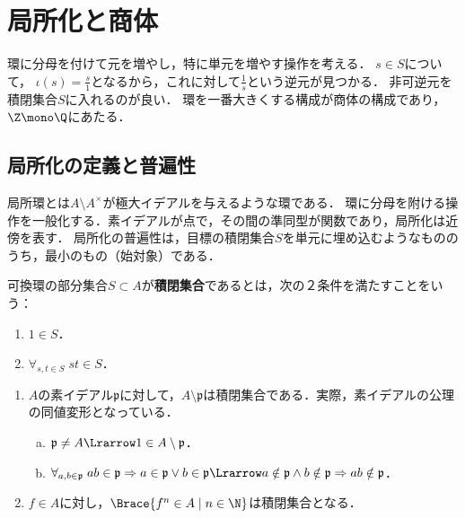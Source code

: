 \documentclass[uplatex,dvipdfmx]{jsreport}
\renewcommand{\p}{\mathfrak{p}}
\begin{document}
\section{局所化と商体}

\begin{tcolorbox}[colframe=ForestGreen, colback=ForestGreen!10!white,breakable,colbacktitle=ForestGreen!40!white,coltitle=black,fonttitle=\bfseries\sffamily,
title=]
    環に分母を付けて元を増やし，特に単元を増やす操作を考える．
    $s\in S$について，
    $\iota(s)=\frac{s}{1}$となるから，これに対して$\frac{1}{s}$という逆元が見つかる．
    非可逆元を積閉集合$S$に入れるのが良い．
    環を一番大きくする構成が商体の構成であり，$\Z\mono\Q$にあたる．
\end{tcolorbox}

\subsection{局所化の定義と普遍性}

\begin{tcolorbox}[colframe=ForestGreen, colback=ForestGreen!10!white,breakable,colbacktitle=ForestGreen!40!white,coltitle=black,fonttitle=\bfseries\sffamily,
title=]
    局所環とは$A\setminus A^\times$が極大イデアルを与えるような環である．
    環に分母を附ける操作を一般化する．素イデアルが点で，その間の準同型が関数であり，局所化は近傍を表す．
    局所化の普遍性は，目標の積閉集合$S$を単元に埋め込むようなもののうち，最小のもの（始対象）である．
\end{tcolorbox}

\begin{definition}
    可換環の部分集合$S\subset A$が\textbf{積閉集合}であるとは，次の２条件を満たすことをいう：
    \begin{enumerate}
        \item $1\in S$．
        \item $\forall_{s,t\in S}\;st\in S$．
    \end{enumerate}
\end{definition}
\begin{example}\mbox{}
    \begin{enumerate}
        \item $A$の素イデアル$\p$に対して，$A\setminus\p$は積閉集合である．実際，素イデアルの公理の同値変形となっている．
        \begin{enumerate}[(a)]
            \item $\p\ne A\Lrarrow 1\in A\setminus\p$．
            \item $\forall_{a,b\in\p}\;ab\in\p\Rightarrow a\in\p\lor b\in\p\Lrarrow a\notin\p\land b\notin\p\Rightarrow ab\notin\p$．
        \end{enumerate}
        \item $f\in A$に対し，$\Brace{f^n\in A\mid n\in\N}$は積閉集合となる．
    \end{enumerate}
\end{example}
\end{document}
